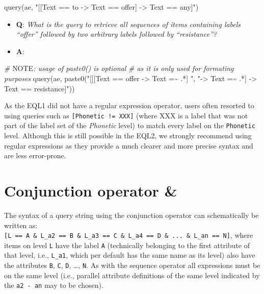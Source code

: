 \documentclass[
]{book}
\newenvironment{Shaded}{\begin{snugshade}}{\end{snugshade}}
\newcommand{\AlertTok}[1]{\textcolor[rgb]{0.94,0.16,0.16}{#1}}
\newcommand{\CommentTok}[1]{\textcolor[rgb]{0.56,0.35,0.01}{\textit{#1}}}
\newcommand{\FunctionTok}[1]{\textcolor[rgb]{0.00,0.00,0.00}{#1}}
\newcommand{\NormalTok}[1]{#1}
\newcommand{\StringTok}[1]{\textcolor[rgb]{0.31,0.60,0.02}{#1}}
\providecommand{\tightlist}{%
  \setlength{\itemsep}{0pt}\setlength{\parskip}{0pt}}
\begin{document}
\begin{Shaded}
\begin{Highlighting}[]
\FunctionTok{query}\NormalTok{(ae, }\StringTok{"[[Text == to {-}\textgreater{} Text == offer] {-}\textgreater{} Text == any]"}\NormalTok{)}
\end{Highlighting}
\end{Shaded}

\begin{itemize}
\tightlist
\item
  \textbf{Q}: \emph{What is the query to retrieve all sequences of items containing labels ``offer'' followed by two arbitrary labels followed by ``resistance''?}
\item
  \textbf{A}:
\end{itemize}

\begin{Shaded}
\begin{Highlighting}[]
\CommentTok{\# }\AlertTok{NOTE}\CommentTok{: usage of paste0() is optional}
\CommentTok{\# as it is only used for formating purposes}
\FunctionTok{query}\NormalTok{(ae, }\FunctionTok{paste0}\NormalTok{(}\StringTok{"[[[Text == offer {-}\textgreater{} Text =\textasciitilde{} .*] "}\NormalTok{,}
                 \StringTok{"{-}\textgreater{} Text =\textasciitilde{} .*] {-}\textgreater{} Text == resistance]"}\NormalTok{))}
\end{Highlighting}
\end{Shaded}

As the EQL1 did not have a regular expression operator, users often resorted to using queries such as \texttt{{[}Phonetic\ !=\ XXX{]}} (where XXX is a label that was not part of the label set of the \emph{Phonetic} level) to match every label on the \texttt{Phonetic} level. Although this is still possible in the EQL2, we strongly recommend using regular expressions as they provide a much clearer and more precise syntax and are less error-prone.

\hypertarget{conjunction-operator}{%
\section{Conjunction operator \&}\label{conjunction-operator}}

The syntax of a query string using the conjunction operator can schematically be written as: \texttt{{[}L\ ==\ A\ \&\ L\_a2\ ==\ B\ \&\ L\_a3\ ==\ C\ \&\ L\_a4\ ==\ D\ \&\ ...\ \&\ L\_an\ ==\ N{]}}, where items on level \texttt{L} have the label \texttt{A} (technically belonging to the first attribute of that level, i.e., \texttt{L\_a1}, which per default has the same name as its level) also have the attributes \texttt{B}, \texttt{C}, \texttt{D}, \ldots{}, \texttt{N}. As with the sequence operator all expressions must be on the same level (i.e., parallel attribute definitions of the same level indicated by the \texttt{a2\ -\ an} may to be chosen).
\end{document}
